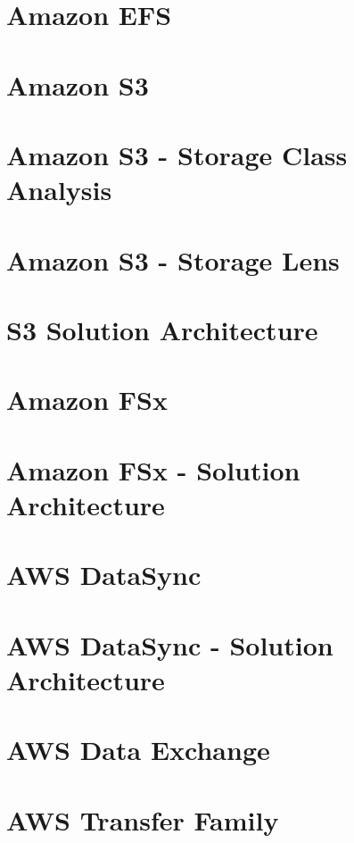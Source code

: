 \documentclass[11pt]{book}
\begin{document}
    \section{Amazon EFS}


    \section{Amazon S3}


    \section{Amazon S3 - Storage Class Analysis}


    \section{Amazon S3 - Storage Lens}


    \section{S3 Solution Architecture}


    \section{Amazon FSx}


    \section{Amazon FSx - Solution Architecture}


    \section{AWS DataSync}


    \section{AWS DataSync - Solution Architecture}


    \section{AWS Data Exchange}


    \section{AWS Transfer Family}
\end{document}
